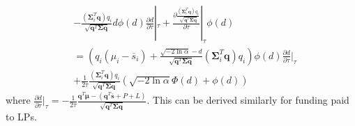 \documentclass{article}
\begin{document}
\begin{appendices}
\begin{align*}
    &-\frac{(\boldsymbol{\Sigma}_i^T\mathbf{q})q_i}{\sqrt{\mathbf{q}^T\boldsymbol{\Sigma}\mathbf{q}}}d\phi(d)\frac{\partial d}{\partial \tau}|_\tau + \frac{\partial \frac{(\boldsymbol{\Sigma}_i^T\mathbf{q})q_i}{\sqrt{\mathbf{q}^T\boldsymbol{\Sigma}\mathbf{q}}}}{\partial \tau}|_\tau \phi(d) \\ 
    &= (q_i(\mu_i-\overline{s}_i)+\frac{\sqrt{-2\ln\alpha}-d}{\sqrt{\mathbf{q}^T\boldsymbol{\Sigma}\mathbf{q}}}(\boldsymbol{\Sigma}_i^T\mathbf{q})q_i)\phi(d)\frac{\partial d}{\partial \tau}|_\tau\\
    &+ \frac{1}{2\tau}\frac{(\boldsymbol{\Sigma}_i^T\mathbf{q})q_i}{\sqrt{\mathbf{q}^T\boldsymbol{\Sigma}\mathbf{q}}}(\sqrt{-2\ln\alpha}\Phi(d) + \phi(d))
\end{align*}
where $\frac{\partial d}{\partial \tau}|_\tau = -\frac{1}{2\tau}\frac{\mathbf{q}^T\boldsymbol{\mu} - (
\mathbf{q}^T\overline{\mathbf{s}}+P+L)}{\sqrt{\mathbf{q}^T\boldsymbol{\Sigma}\mathbf{q}}}$.
This can be derived similarly for funding paid to LPs.
\end{appendices}
\end{document}
